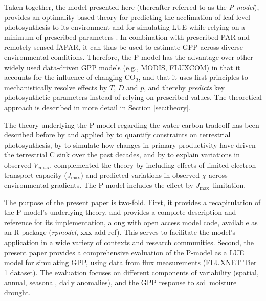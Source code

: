 \documentclass{myreport}
\newcommand{\vcmax}{$V_{\text{cmax}}$}
\newcommand{\jmax}{$J_{\text{max}}$}
\begin{document}
Taken together, the model presented here (thereafter referred to as the \textit{P-model}), provides an optimality-based theory for predicting the acclimation of leaf-level photosynthesis to its environment \citep{prentice14ecollett} and for simulating LUE while relying on a minimum of prescribed parameters \citep{wang17natpl}. In combination with prescribed PAR and remotely sensed fAPAR, it can thus be used to estimate GPP across diverse environmental conditions. Therefore, the P-model has the advantage over other widely used data-driven GPP models (e.g., MODIS, FLUXCOM) in that it accounts for the influence of changing CO$_2$, and that it uses first principles to mechanistically resolve effects by $T$, $D$ and $p$, and thereby \textit{predicts} key photosynthetic parameters instead of relying on prescribed values. The theoretical approach is described in more detail in Section \ref{sec:theory}.

The theory underlying the P-model regarding the water-carbon tradeoff has been described before by \cite{prentice14ecollett} and applied by \cite{wanghan14} to quantify constraints on terrestrial photosynthesis, by \cite{keenan17natcomm} to simulate how changes in primary productivity have driven the terrestrial C sink over the past decades, and by \cite{smith19ecollett} to explain variations in observed \vcmax .  \cite{wang17natpl} complemented the theory by including effects of limited electron transport capacity (\jmax ) and predicted variations in observed $\chi$ across environmental gradients. The P-model includes the effect by \jmax\ limitation.

The purpose of the present paper is two-fold. First, it provides a recapitulation of the P-model's underlying theory, and provides a complete description and reference for its implementation, along with open access model code, available as an R package (\textit{rpmodel}, xxx add ref). This serves to facilitate the model's application in a wide variety of contexts and research communities. Second, the present paper provides a comprehensive evaluation of the P-model as a LUE model for simulating GPP, using data from flux measurements (FLUXNET Tier 1 dataset). The evaluation focuses on different components of variability (spatial, annual, seasonal, daily anomalies), and the GPP response to soil moisture drought.
\end{document}
